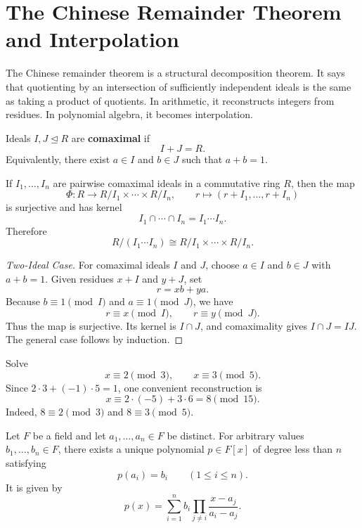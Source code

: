 \section{The Chinese Remainder Theorem and Interpolation}

The Chinese remainder theorem is a structural decomposition theorem. It says that quotienting by an intersection of sufficiently independent ideals is the same as taking a product of quotients. In arithmetic, it reconstructs integers from residues. In polynomial algebra, it becomes interpolation.

\begin{definition}
Ideals $I,J\trianglelefteq R$ are \textbf{comaximal} if
\[
    I+J=R.
\]
Equivalently, there exist $a\in I$ and $b\in J$ such that $a+b=1$.
\end{definition}

\begin{theorem}
If $I_1,\dots,I_n$ are pairwise comaximal ideals in a commutative ring $R$, then the map
\[
    \Phi:R\to R/I_1\times\cdots\times R/I_n,
    \qquad
    r\mapsto(r+I_1,\dots,r+I_n)
\]
is surjective and has kernel
\[
    I_1\cap\cdots\cap I_n=I_1\cdots I_n.
\]
Therefore
\[
    R/(I_1\cdots I_n)
    \cong
    R/I_1\times\cdots\times R/I_n.
\]
\end{theorem}

\begin{proof}[Two-Ideal Case]
For comaximal ideals $I$ and $J$, choose $a\in I$ and $b\in J$ with $a+b=1$. Given residues $x+I$ and $y+J$, set
\[
    r=xb+ya.
\]
Because $b\equiv1\pmod I$ and $a\equiv1\pmod J$, we have
\[
    r\equiv x\pmod I,
    \qquad
    r\equiv y\pmod J.
\]
Thus the map is surjective. Its kernel is $I\cap J$, and comaximality gives $I\cap J=IJ$. The general case follows by induction.
\end{proof}

\begin{example}
Solve
\[
    x\equiv2\pmod3,
    \qquad
    x\equiv3\pmod5.
\]
Since $2\cdot3+(-1)\cdot5=1$, one convenient reconstruction is
\[
    x\equiv2\cdot(-5)+3\cdot6=8\pmod{15}.
\]
Indeed, $8\equiv2\pmod3$ and $8\equiv3\pmod5$.
\end{example}

\begin{theorem}
Let $F$ be a field and let $a_1,\dots,a_n\in F$ be distinct. For arbitrary values $b_1,\dots,b_n\in F$, there exists a unique polynomial $p\in F[x]$ of degree less than $n$ satisfying
\[
    p(a_i)=b_i\qquad(1\leq i\leq n).
\]
It is given by
\[
    p(x)=\sum_{i=1}^n b_i
    \prod_{j\neq i}\frac{x-a_j}{a_i-a_j}.
\]
\end{theorem}

